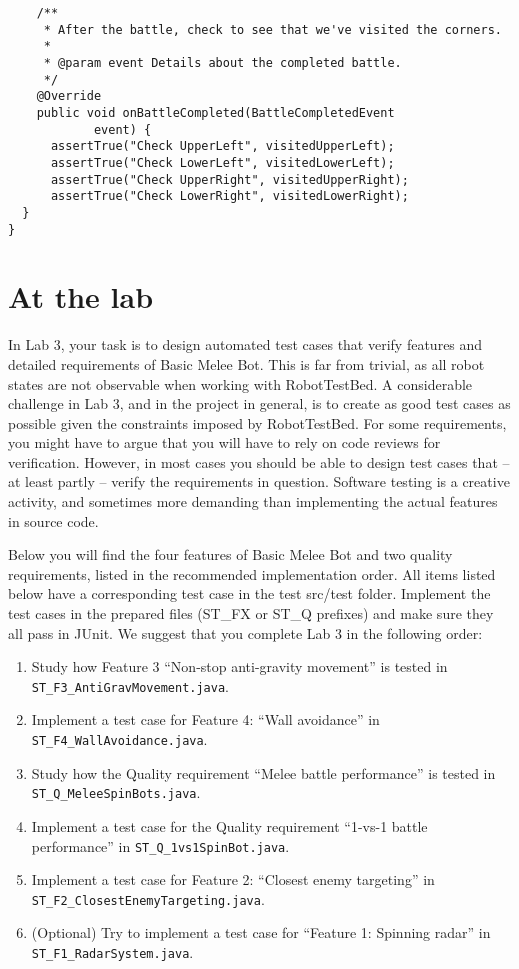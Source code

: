 \documentclass{scrreprt}
\begin{document}
\begin{verbatim}
	/**
	 * After the battle, check to see that we've visited the corners.
	 *
	 * @param event Details about the completed battle.
	 */
	@Override
	public void onBattleCompleted(BattleCompletedEvent
			event) {
      assertTrue("Check UpperLeft", visitedUpperLeft);
      assertTrue("Check LowerLeft", visitedLowerLeft);
      assertTrue("Check UpperRight", visitedUpperRight);
      assertTrue("Check LowerRight", visitedLowerRight);
  }
}
\end{verbatim}

\chapter{At the lab} \label{sec:atlab}
In Lab 3, your task is to design automated test cases that verify features and detailed requirements of Basic Melee Bot. This is far from trivial, as all robot states are not observable when working with RobotTestBed. A considerable challenge in Lab 3, and in the project in general, is to create as good test cases as possible given the constraints imposed by RobotTestBed. For some requirements, you might have  to argue that you will have to rely on code reviews for verification. However, in most cases you should be able to design test cases that -- at least partly -- verify the requirements in question. Software testing is a creative activity, and sometimes more demanding than implementing the actual features in source code.

Below you will find the four features of Basic Melee Bot and two quality requirements, listed in the recommended implementation order. All items listed below have a corresponding test case in the test src/test folder. Implement the test cases in the prepared files (ST_FX or ST_Q prefixes) and make sure they all pass in JUnit. We suggest that you complete Lab 3 in the following order:

\begin{enumerate}
\item Study how Feature 3 ``Non-stop anti-gravity movement'' is tested in\\ \texttt{ST_F3_AntiGravMovement.java}.
\item Implement a test case for Feature 4: ``Wall avoidance'' in\\ \texttt{ST_F4_WallAvoidance.java}.
\item Study how the Quality requirement ``Melee battle performance'' is tested in\\ \texttt{ST_Q_MeleeSpinBots.java}.
\item Implement a test case for the Quality requirement ``1-vs-1 battle performance'' in \texttt{ST_Q_1vs1SpinBot.java}.
\item Implement a test case for Feature 2: ``Closest enemy targeting'' in\\ \texttt{ST_F2_ClosestEnemyTargeting.java}.
\item (Optional) Try to implement a test case for ``Feature 1: Spinning radar'' in\\ \texttt{ST_F1_RadarSystem.java}.
\end{enumerate}
\end{document}
